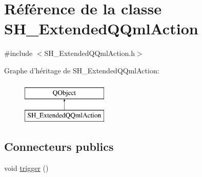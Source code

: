 \hypertarget{classSH__ExtendedQQmlAction}{\section{Référence de la classe S\-H\-\_\-\-Extended\-Q\-Qml\-Action}
\label{classSH__ExtendedQQmlAction}
}


{\ttfamily \#include $<$S\-H\-\_\-\-Extended\-Q\-Qml\-Action.\-h$>$}

Graphe d'héritage de S\-H\-\_\-\-Extended\-Q\-Qml\-Action\-:\begin{figure}[H]
\begin{center}
\leavevmode
\includegraphics[height=2.000000cm]{classSH__ExtendedQQmlAction}
\end{center}
\end{figure}
\subsection*{Connecteurs publics}
\begin{DoxyCompactItemize}
\item 
void \hyperlink{classSH__ExtendedQQmlAction_abf79bb6cb923d27e2fc5dfc05ff513c2}{trigger} ()
\end{DoxyCompactItemize}
